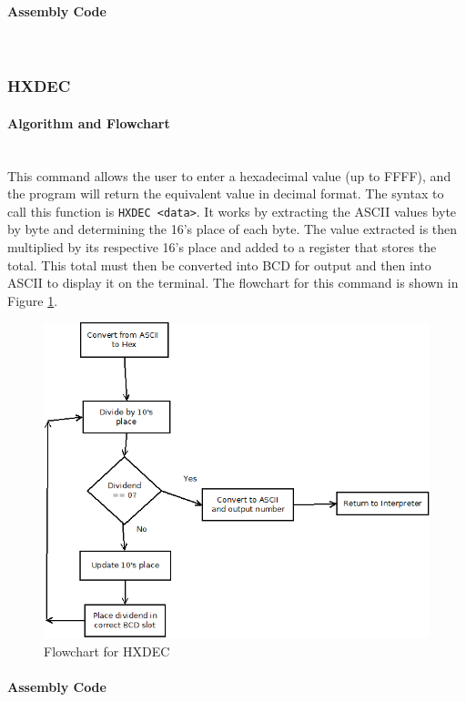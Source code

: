 \documentclass[12pt]{article}
\begin{document}
			\paragraph{Assembly Code}~\\
			
			
			\subsubsection{HXDEC}
			\paragraph{Algorithm and Flowchart}~\\
			This command allows the user to enter a hexadecimal value (up to FFFF), and the program will return the equivalent value in decimal format. The syntax to call this function is \texttt{HXDEC <data>}. It works by extracting the ASCII values byte by byte and determining the 16's place of each byte. The value extracted is then multiplied by its respective 16's place and added to a register that stores the total. This total must then be converted into BCD for output and then into ASCII to display it on the terminal. The flowchart for this command is shown in Figure \ref{fig:HXDEC}.
			
			
\begin{figure}[H]
\centering
\includegraphics[width=0.7\linewidth]{HXDEC}
\caption{Flowchart for HXDEC}
\label{fig:HXDEC}
\end{figure}
			\paragraph{Assembly Code}~\\
			
			
\end{document}
